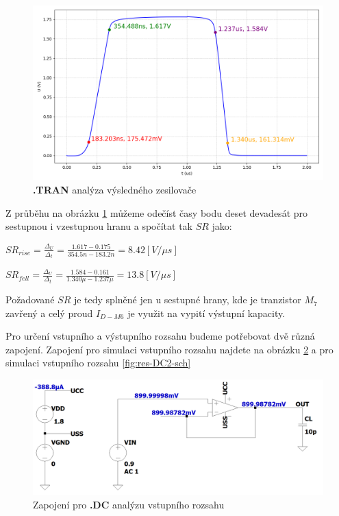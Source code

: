 \begin{figure}[h!]
    \centering
    \includegraphics[width=\textwidth]{text/img/TRANS-charakteristika.png}
    \caption{\label{fig:res-TRANS-char} {\bf .TRAN} analýza výsledného zesilovače}
\end{figure}

Z průběhu na obrázku \ref{fig:res-TRANS-char} můžeme odečíst časy bodu deset devadesát pro sestupnou i vzestupnou hranu a spočítat tak \(SR\) jako:
\begin{center}
    \Large
    \(
        SR_{rise} = \frac{\Delta_U}{\Delta_t} = \frac{1.617-0.175}{354.5n - 183.2n} = 8.42 [V/\mu s]
    \)
\end{center}
\begin{center}
    \Large
    \(
        SR_{fell} = \frac{\Delta_U}{\Delta_t} = \frac{1.584 - 0.161}{1.340\mu - 1.237\mu} = 13.8 [V/\mu s]
    \)
\end{center}

Požadované \(SR\) je tedy splněné jen u sestupné hrany, kde je tranzistor \(M_7\) zavřený a celý proud \(I_{D-M6}\) je využit na vypití výstupní kapacity.

Pro určení vstupního a výstupního rozsahu budeme potřebovat dvě různá zapojení.
Zapojení pro simulaci vstupního rozsahu najdete na obrázku \ref{fig:res-DC-sch} a pro simulaci vstupního rozsahu \ref{fig:res-DC2-sch}

\begin{figure}[h!]
    \centering
    \includegraphics[width=\textwidth]{text/img/DC-sch.png}
    \caption{\label{fig:res-DC-sch} Zapojení pro {\bf .DC} analýzu vstupního rozsahu}
\end{figure}

